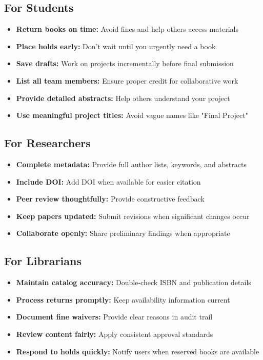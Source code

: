 \documentclass[12pt,a4paper]{article}
\begin{document}
\subsection{For Students}
\begin{itemize}[leftmargin=*]
    \item \textbf{Return books on time:} Avoid fines and help others access materials
    \item \textbf{Place holds early:} Don't wait until you urgently need a book
    \item \textbf{Save drafts:} Work on projects incrementally before final submission
    \item \textbf{List all team members:} Ensure proper credit for collaborative work
    \item \textbf{Provide detailed abstracts:} Help others understand your project
    \item \textbf{Use meaningful project titles:} Avoid vague names like "Final Project"
\end{itemize}

\subsection{For Researchers}
\begin{itemize}[leftmargin=*]
    \item \textbf{Complete metadata:} Provide full author lists, keywords, and abstracts
    \item \textbf{Include DOI:} Add DOI when available for easier citation
    \item \textbf{Peer review thoughtfully:} Provide constructive feedback
    \item \textbf{Keep papers updated:} Submit revisions when significant changes occur
    \item \textbf{Collaborate openly:} Share preliminary findings when appropriate
\end{itemize}

\subsection{For Librarians}
\begin{itemize}[leftmargin=*]
    \item \textbf{Maintain catalog accuracy:} Double-check ISBN and publication details
    \item \textbf{Process returns promptly:} Keep availability information current
    \item \textbf{Document fine waivers:} Provide clear reasons in audit trail
    \item \textbf{Review content fairly:} Apply consistent approval standards
    \item \textbf{Respond to holds quickly:} Notify users when reserved books are available
\end{itemize}
\end{document}
